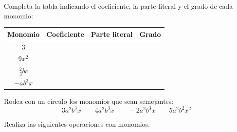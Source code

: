 \documentclass[addpoints,spanish, 12pt,a4paper]{exam}
\begin{document}
\begin{questions}



\question[2]
Completa la tabla indicando el coeficiente, la parte literal y el grado de cada monomio:
\vspace{10pt}

\begin{tabular}{|c|c|c|c|}
\hline
\textbf{Monomio} & \textbf{Coeficiente} & \textbf{Parte literal} & \textbf{Grado} \\
\hline
3 & & & \\
\hline
$9x^2$ & & & \\
\hline
$\frac{2}{3}bc$ & & & \\
\hline
$-ab^3x$ & & & \\
\hline
\end{tabular}


\question[1]
Rodea con un círculo los monomios que sean semejantes:
\[
3a^2b^3x \quad\quad 4a^2b^3x \quad\quad -2a^2b^3x \quad\quad 5a^2b^2x^2
\]

\question[1]
Realiza las siguientes operaciones con monomios:
\begin{multicols}{2}
\end{multicols}
\end{questions}
\end{document}
